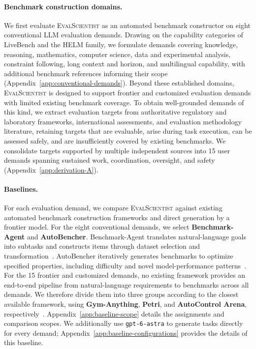 \documentclass{article} %
\begin{document}
	\paragraph{Benchmark construction domains.}
	We first evaluate \textsc{EvalScientist} as an automated benchmark constructor on
	eight conventional LLM evaluation demands. Drawing on the capability categories
	of LiveBench and the HELM family, we formulate demands covering knowledge,
	reasoning, mathematics, computer science, data and experimental analysis,
	constraint following, long context and horizon, and multilingual capability,
	with additional benchmark references informing their scope
	(Appendix~\ref{app:conventional-demands}). Beyond these established domains,
	\textsc{EvalScientist} is designed to support frontier and customized evaluation
	demands with limited existing benchmark coverage. To obtain well-grounded
	demands of this kind, we extract evaluation targets from authoritative
	regulatory and laboratory frameworks, international assessments, and evaluation
	methodology literature, retaining targets that are evaluable, arise during
	task execution, can be assessed safely, and are insufficiently covered by
	existing benchmarks. We consolidate targets supported by multiple independent
	sources into 15 user demands spanning sustained work, coordination, oversight,
	and safety (Appendix~\ref{app:derivation-A}).

	\paragraph{Baselines.}
	For each evaluation demand, we compare \textsc{EvalScientist} against existing
	automated benchmark construction frameworks and direct generation by a frontier
	model. For the eight conventional demands, we select \textbf{Benchmark-Agent}
	and \textbf{AutoBencher}. Benchmark-Agent translates natural-language goals
	into subtasks and constructs items through dataset selection and
	transformation~\citep{xiong2026benchmarkagent}. AutoBencher iteratively generates
	benchmarks to optimize specified properties, including difficulty and novel
	model-performance patterns~\citep{li2025autobencher}. For the 15 frontier and
	customized demands, no existing framework provides an end-to-end pipeline from
	natural-language requirements to benchmarks across all demands. We therefore
	divide them into three groups according to the closest available framework,
	using \textbf{Gym-Anything}, \textbf{Petri}, and \textbf{AutoControl Arena},
	respectively~\citep{aggarwal2026gymanything,fronsdal2025petri,li2026autocontrol}.
	Appendix~\ref{app:baseline-scope} details the assignments and comparison scopes.
	We additionally use \texttt{gpt-6-astra} to generate tasks directly for every
	demand; Appendix~\ref{app:baseline-configurations} provides the details of this baseline.
	
\end{document}
